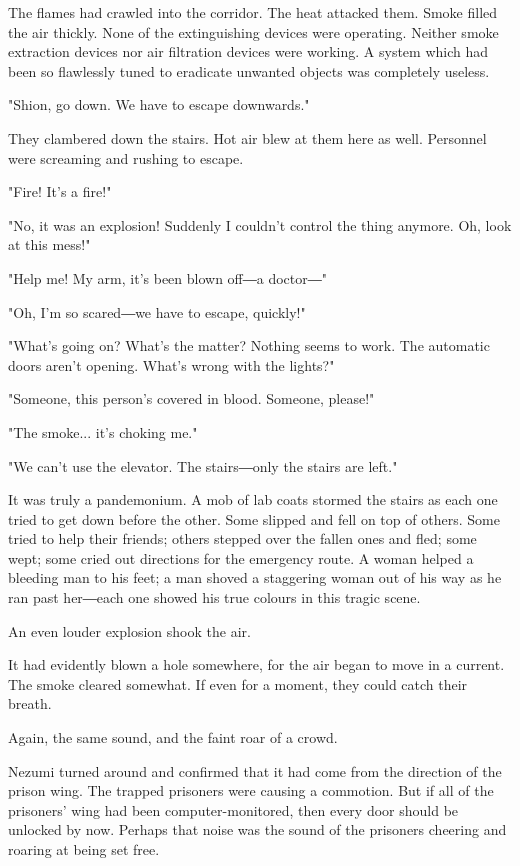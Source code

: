 The flames had crawled into the corridor. The heat attacked them. Smoke
filled the air thickly. None of the extinguishing devices were
operating. Neither smoke extraction devices nor air filtration devices
were working. A system which had been so flawlessly tuned to eradicate
unwanted objects was completely useless.

"Shion, go down. We have to escape downwards."

They clambered down the stairs. Hot air blew at them here as well.
Personnel were screaming and rushing to escape.

"Fire! It's a fire!"

"No, it was an explosion! Suddenly I couldn't control the thing anymore.
Oh, look at this mess!"

"Help me! My arm, it's been blown off―a doctor―"

"Oh, I'm so scared―we have to escape, quickly!"

"What's going on? What's the matter? Nothing seems to work. The
automatic doors aren't opening. What's wrong with the lights?"

"Someone, this person's covered in blood. Someone, please!"

"The smoke... it's choking me."

"We can't use the elevator. The stairs―only the stairs are left."

It was truly a pandemonium. A mob of lab coats stormed the stairs as
each one tried to get down before the other. Some slipped and fell on
top of others. Some tried to help their friends; others stepped over the
fallen ones and fled; some wept; some cried out directions for the
emergency route. A woman helped a bleeding man to his feet; a man shoved
a staggering woman out of his way as he ran past her―each one showed his
true colours in this tragic scene.

An even louder explosion shook the air.

It had evidently blown a hole somewhere, for the air began to move in a
current. The smoke cleared somewhat. If even for a moment, they could
catch their breath.

Again, the same sound, and the faint roar of a crowd.

Nezumi turned around and confirmed that it had come from the direction
of the prison wing. The trapped prisoners were causing a commotion. But
if all of the prisoners' wing had been computer-monitored, then every
door should be unlocked by now. Perhaps that noise was the sound of the
prisoners cheering and roaring at being set free.

